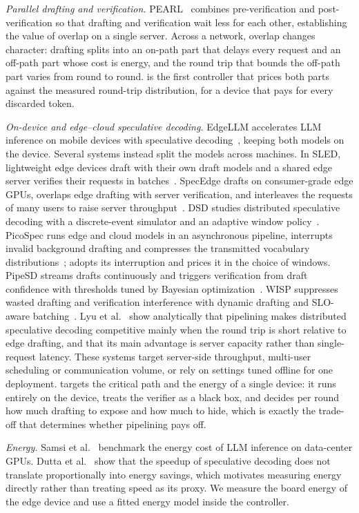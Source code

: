 \emph{Parallel drafting and verification.} PEARL~\cite{pearl2025} combines pre-verification and post-verification so that drafting and verification wait less for each other, establishing the value of overlap on a single server. Across a network, overlap changes character: drafting splits into an on-path part that delays every request and an off-path part whose cost is energy, and the round trip that bounds the off-path part varies from round to round. \cape{} is the first controller that prices both parts against the measured round-trip distribution, for a device that pays for every discarded token.

\emph{On-device and edge--cloud speculative decoding.} EdgeLLM accelerates LLM inference on mobile devices with speculative decoding~\cite{edgellm2025}, keeping both models on the device. Several systems instead split the models across machines. In SLED, lightweight edge devices draft with their own draft models and a shared edge server verifies their requests in batches~\cite{sled2025}. SpecEdge drafts on consumer-grade edge GPUs, overlaps edge drafting with server verification, and interleaves the requests of many users to raise server throughput~\cite{specedge2025}. DSD studies distributed speculative decoding with a discrete-event simulator and an adaptive window policy~\cite{dsd2025}. PicoSpec runs edge and cloud models in an asynchronous pipeline, interrupts invalid background drafting and compresses the transmitted vocabulary distributions~\cite{picospec2026}; \cape{} adopts its interruption and prices it in the choice of windows. PipeSD streams drafts continuously and triggers verification from draft confidence with thresholds tuned by Bayesian optimization~\cite{pipesd2026}. WISP suppresses wasted drafting and verification interference with dynamic drafting and SLO-aware batching~\cite{wisp2026}. Lyu et al.~\cite{distance2026} show analytically that pipelining makes distributed speculative decoding competitive mainly when the round trip is short relative to edge drafting, and that its main advantage is server capacity rather than single-request latency. These systems target server-side throughput, multi-user scheduling or communication volume, or rely on settings tuned offline for one deployment. \cape{} targets the critical path and the energy of a single device: it runs entirely on the device, treats the verifier as a black box, and decides per round how much drafting to expose and how much to hide, which is exactly the trade-off that determines whether pipelining pays off.

\emph{Energy.} Samsi et al.~\cite{samsi2023} benchmark the energy cost of LLM inference on data-center GPUs. Dutta et al.~\cite{energy2026} show that the speedup of speculative decoding does not translate proportionally into energy savings, which motivates measuring energy directly rather than treating speed as its proxy. We measure the board energy of the edge device and use a fitted energy model inside the controller.
